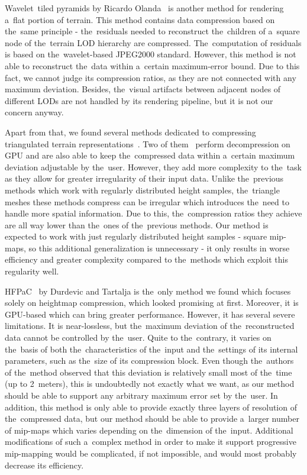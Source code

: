  Wavelet~tiled pyramids by Ricardo Olanda~\cite{jpeg2000terrain} is another method for rendering a~flat portion of terrain. This method contains data compression based on the~same principle - the~residuals needed to reconstruct the~children of a~square node of the~terrain LOD hierarchy are compressed. The~computation of residuals is based on the~wavelet-based JPEG2000 standard. However, this method is not able to reconstruct the~data within a~certain maximum-error bound. Due to this fact, we cannot judge its compression ratios, as they are not connected with any maximum deviation. Besides, the~visual artifacts between adjacent nodes of different LODs are not handled by its rendering pipeline, but it is not our concern anyway.
 
 Apart from that, we found several methods dedicated to compressing triangulated terrain representations~\cite{meshesGPU1, meshesGPU2, meshes}. Two of them~\cite{meshesGPU1, meshesGPU2} perform decompression on GPU and are also able to keep the~compressed data within a~certain maximum deviation adjustable by the~user. However, they add more complexity to the~task as they allow for greater irregularity of their input data. Unlike the~previous methods which work with regularly distributed height samples, the~triangle meshes these methods compress can be irregular which introduces the~need to handle more spatial information. Due to this, the~compression ratios they achieve are all way lower than the~ones of the~previous methods. Our method is expected to work with just regularly distributed height samples - square mip-maps, so this additional generalization is unnecessary - it only results in worse efficiency and greater complexity compared to the~methods which exploit this regularity well.
 
 HFPaC~\cite{fieldGPU} by Durdevic and Tartalja is the~only method we found which focuses solely on heightmap compression, which looked promising at first. Moreover, it is GPU-based which can bring greater performance. However, it has several severe limitations. It is near-lossless, but the~maximum deviation of the~reconstructed data cannot be controlled by the~user. Quite to the~contrary, it varies on the~basis of both the~characteristics of the~input and the~settings of its internal parameters, such as the~size of its compression block. Even though the~authors of the~method observed that this deviation is relatively small most of the~time (up to 2~meters), this is undoubtedly not exactly what we want, as our method should be able to support any arbitrary maximum error set by the~user. In addition, this method is only able to provide exactly three layers of resolution of the~compressed data, but our method should be able to provide a~larger number of mip-maps which varies depending on the~dimension of the~input. Additional modifications of such a~complex method in order to make it support progressive mip-mapping would be complicated, if not impossible, and would most probably decrease its efficiency.
 
